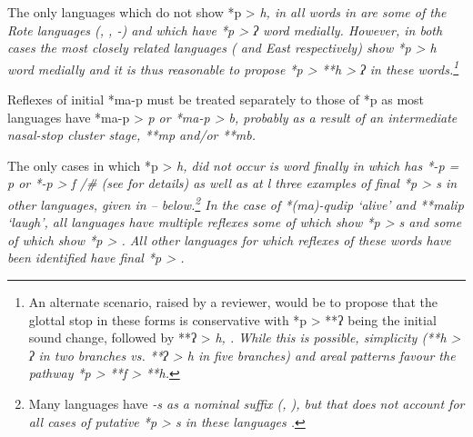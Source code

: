 The only languages which do not show *p > \it{h},
{\0} in all words in  are some of the Rote languages
(, , -) and   which have *p > \it{ʔ} word medially.
However, in both cases the most closely related languages (
and East  respectively) show *p > \it{h} word medially
and it is thus reasonable to propose *p > **h > ʔ in these words.\footnote{
		An alternate scenario, raised by a reviewer,
		would be to propose that the glottal stop in these forms is conservative
		with *p > **ʔ being the initial sound change,
		followed by **ʔ > \it{h}, {\0}.
		While this is possible,
		simplicity (**h > \it{ʔ} in two branches vs.
		**ʔ > \it{h} in five branches)
		and areal patterns favour the pathway *p > **f > **h.}

Reflexes of initial *ma-p must be treated separately to those
of *p as most  languages have *ma-p > \it{p}
or *ma-p > \it{b},
probably as a result of an intermediate nasal-stop cluster stage, **mp and/or **mb.

The only cases in which *p > \it{h,} {\0} did not occur is word
finally in  which has *-p = \it{p} or
*-p > \it{f} /{\gap}{\#} (see  for details) as well
as at l three examples of final *p > \it{s} in other 
languages, given in -- below.\footnote{
		Many  languages have
		\it{-s} as a nominal suffix (\citealp[442f, 445f]{Edwards2020}, \citealp[167--176]{Tamelan2021}), but that does
		not account for all cases of putative *p > \it{s} in these languages
		\citep[74]{Edwards2021}.}
In the case of *(ma)-qudip ‘alive’
and **malip ‘laugh’, all languages have multiple reflexes some
of which show *p > \it{s}
and some of which show *p > {\0}.
All other  languages for which reflexes of these
words have been identified have final *p > {\0}.

